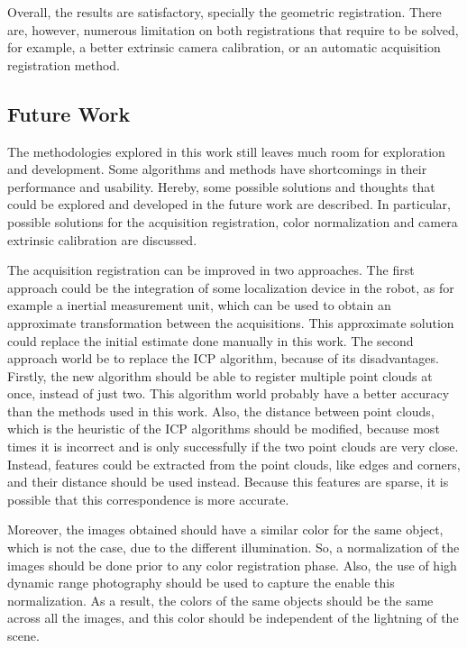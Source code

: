 Overall, the results are satisfactory, specially the geometric registration. There are, however, numerous limitation on both registrations that require to be solved, for example, a better extrinsic camera calibration, or an automatic acquisition registration method.


\subsection{Future Work}
\label{section:future-work}

The methodologies explored in this work still leaves much room for exploration and development. Some algorithms and methods have shortcomings in their performance and usability. Hereby, some possible solutions and thoughts that could be explored and developed in the future work are described. In particular, possible solutions for the acquisition registration, color normalization and camera extrinsic calibration are discussed.

The acquisition registration can be improved in two approaches. The first approach could be the integration of some localization device in the robot, as for example a inertial measurement unit, which can be used to obtain an approximate transformation between the acquisitions. This approximate solution could replace the initial estimate done manually in this work. The second approach world be  to replace the ICP algorithm, because of its disadvantages. Firstly, the new algorithm should be able to register multiple point clouds at once, instead of just two. This algorithm world probably have a better accuracy than the methods used in this work. Also, the distance between point clouds, which is the heuristic of the ICP algorithms should be modified, because most times it is incorrect and is only successfully if the two point clouds are very close. Instead, features could be extracted from the point clouds, like edges and corners, and their distance should be used instead. Because this features are sparse, it is possible that this correspondence is more accurate.

Moreover, the images obtained should have a similar color for the same object, which is not the case, due to the different illumination. So, a normalization of the images should be done prior to any color registration phase. Also, the use of high dynamic range photography should be used to capture the enable this normalization. As a result, the colors of the same objects should be the same across all the images, and this color should be independent of the lightning of the scene.

